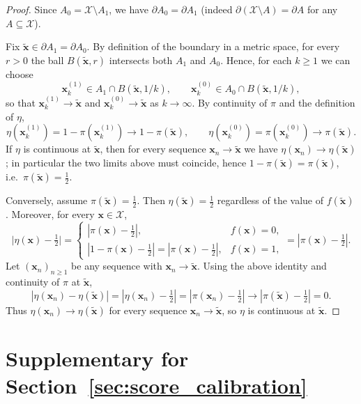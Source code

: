 \documentclass{article}
\theoremstyle{plain}
\theoremstyle{definition}
\theoremstyle{remark}
\begin{document}
\EtaSmooth*
\begin{proof}
Since $A_0=\mathcal X\setminus A_1$, we have $\partial A_0=\partial A_1$ (indeed $\partial(\mathcal X\setminus A)=\partial A$
for any $A\subseteq\mathcal X$).

Fix $\tilde{\mathbf{x}}\in\partial A_1=\partial A_0$.
By definition of the boundary in a metric space, for every $r>0$ the ball $B(\tilde{\mathbf{x}},r)$ intersects both $A_1$ and $A_0$.
Hence, for each $k\ge 1$ we can choose
\[
\mathbf{x}_k^{(1)}\in A_1\cap B(\tilde{\mathbf{x}},1/k),
\qquad
\mathbf{x}_k^{(0)}\in A_0\cap B(\tilde{\mathbf{x}},1/k),
\]
so that $\mathbf{x}_k^{(1)}\to\tilde{\mathbf{x}}$ and $\mathbf{x}_k^{(0)}\to\tilde{\mathbf{x}}$ as $k\to\infty$.
By continuity of $\pi$ and the definition of $\eta$,
\[
\eta(\mathbf{x}_k^{(1)})=1-\pi(\mathbf{x}_k^{(1)})\to 1-\pi(\tilde{\mathbf{x}}),
\qquad
\eta(\mathbf{x}_k^{(0)})=\pi(\mathbf{x}_k^{(0)})\to \pi(\tilde{\mathbf{x}}).
\]
If $\eta$ is continuous at $\tilde{\mathbf{x}}$, then for every sequence $\mathbf{x}_n\to\tilde{\mathbf{x}}$ we have
$\eta(\mathbf{x}_n)\to\eta(\tilde{\mathbf{x}})$; in particular the two limits above must coincide, hence
$1-\pi(\tilde{\mathbf{x}})=\pi(\tilde{\mathbf{x}})$, i.e.\ $\pi(\tilde{\mathbf{x}})=\tfrac12$.

Conversely, assume $\pi(\tilde{\mathbf{x}})=\tfrac12$. Then $\eta(\tilde{\mathbf{x}})=\tfrac12$ regardless of the value of $f(\tilde{\mathbf{x}})$.
Moreover, for every $\mathbf{x}\in\mathcal X$,
\[
\bigl|\eta(\mathbf{x})-\tfrac12\bigr|
=
\begin{cases}
|\pi(\mathbf{x})-\tfrac12|, & f(\mathbf{x})=0,\\
|1-\pi(\mathbf{x})-\tfrac12|=|\pi(\mathbf{x})-\tfrac12|, & f(\mathbf{x})=1,
\end{cases}
=|\pi(\mathbf{x})-\tfrac12|.
\]
Let $(\mathbf{x}_n)_{n\ge 1}$ be any sequence with $\mathbf{x}_n\to\tilde{\mathbf{x}}$. Using the above identity and continuity of $\pi$ at $\tilde{\mathbf{x}}$,
\[
|\eta(\mathbf{x}_n)-\eta(\tilde{\mathbf{x}})|
=|\eta(\mathbf{x}_n)-\tfrac12|
=|\pi(\mathbf{x}_n)-\tfrac12|
\to |\pi(\tilde{\mathbf{x}})-\tfrac12|=0.
\]
Thus $\eta(\mathbf{x}_n)\to\eta(\tilde{\mathbf{x}})$ for every sequence $\mathbf{x}_n\to\tilde{\mathbf{x}}$, so $\eta$ is continuous at $\tilde{\mathbf{x}}$.
\end{proof}

\section{Supplementary for Section~\ref{sec:score_calibration}}
\end{document}
